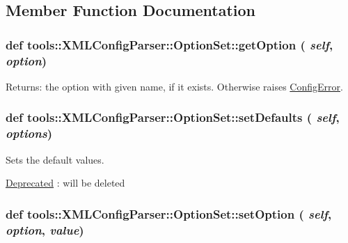 \subsection{Member Function Documentation}
\hypertarget{classtools_1_1XMLConfigParser_1_1OptionSet_50ceb2f5657667e4c0b3ccd71fbf0986}{
\subsubsection{\setlength{\rightskip}{0pt plus 5cm}def tools::XMLConfigParser::OptionSet::getOption ( {\em self}, \/   {\em option})}}
\label{classtools_1_1XMLConfigParser_1_1OptionSet_50ceb2f5657667e4c0b3ccd71fbf0986}


\begin{Desc}
\item[Returns:]the option with given name, if it exists. Otherwise raises \hyperlink{classtools_1_1XMLConfigParser_1_1ConfigError}{ConfigError}. \end{Desc}
\hypertarget{classtools_1_1XMLConfigParser_1_1OptionSet_6c3e2b6ef7030f2f9525bb52de68531d}{
\subsubsection{\setlength{\rightskip}{0pt plus 5cm}def tools::XMLConfigParser::OptionSet::setDefaults ( {\em self}, \/   {\em options})}}
\label{classtools_1_1XMLConfigParser_1_1OptionSet_6c3e2b6ef7030f2f9525bb52de68531d}


Sets the default values. 

\begin{Desc}
\item[\hyperlink{deprecated__deprecated000001}{Deprecated}]: will be deleted \end{Desc}
\hypertarget{classtools_1_1XMLConfigParser_1_1OptionSet_ed3b8e8b77f780936f38389ab833f5ff}{
\subsubsection{\setlength{\rightskip}{0pt plus 5cm}def tools::XMLConfigParser::OptionSet::setOption ( {\em self}, \/   {\em option}, \/   {\em value})}}
\label{classtools_1_1XMLConfigParser_1_1OptionSet_ed3b8e8b77f780936f38389ab833f5ff}


